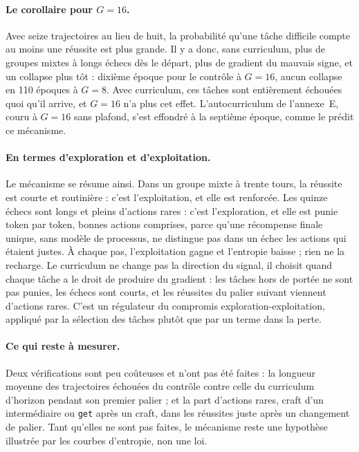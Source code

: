 \documentclass[11pt,a4paper]{article}
\begin{document}
\paragraph{Le corollaire pour $G=16$.} Avec seize trajectoires au lieu de huit, la probabilité qu'une tâche difficile compte au moins une réussite est plus grande. Il y a donc, sans curriculum, plus de groupes mixtes à longs échecs dès le départ, plus de gradient du mauvais signe, et un collapse plus tôt : dixième époque pour le contrôle à $G=16$, aucun collapse en 110 époques à $G=8$. Avec curriculum, ces tâches sont entièrement échouées quoi qu'il arrive, et $G=16$ n'a plus cet effet. L'autocurriculum de l'annexe~E, couru à $G=16$ sans plafond, s'est effondré à la septième époque, comme le prédit ce mécanisme.

\paragraph{En termes d'exploration et d'exploitation.} Le mécanisme se résume ainsi. Dans un groupe mixte à trente tours, la réussite est courte et routinière : c'est l'exploitation, et elle est renforcée. Les quinze échecs sont longs et pleins d'actions rares : c'est l'exploration, et elle est punie token par token, bonnes actions comprises, parce qu'une récompense finale unique, sans modèle de processus, ne distingue pas dans un échec les actions qui étaient justes. À chaque pas, l'exploitation gagne et l'entropie baisse ; rien ne la recharge. Le curriculum ne change pas la direction du signal, il choisit quand chaque tâche a le droit de produire du gradient : les tâches hors de portée ne sont pas punies, les échecs sont courts, et les réussites du palier suivant viennent d'actions rares. C'est un régulateur du compromis exploration-exploitation, appliqué par la sélection des tâches plutôt que par un terme dans la perte.


\paragraph{Ce qui reste à mesurer.} Deux vérifications sont peu coûteuses et n'ont pas été faites : la longueur moyenne des trajectoires échouées du contrôle contre celle du curriculum d'horizon pendant son premier palier ; et la part d'actions rares, craft d'un intermédiaire ou \texttt{get} après un craft, dans les réussites juste après un changement de palier. Tant qu'elles ne sont pas faites, le mécanisme reste une hypothèse illustrée par les courbes d'entropie, non une loi.
\end{document}

